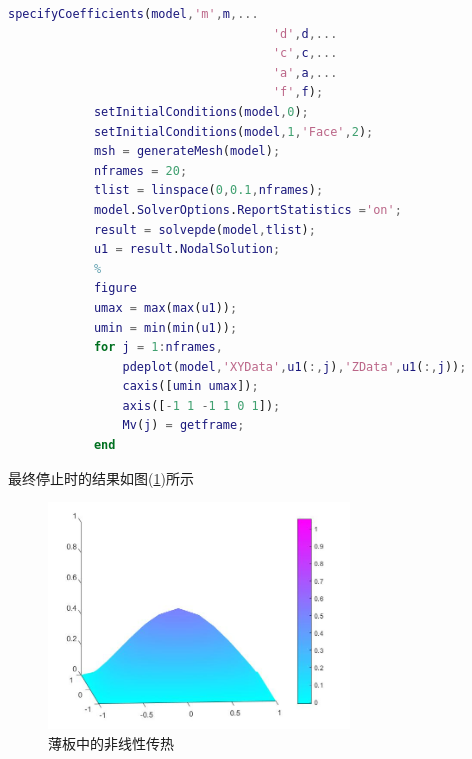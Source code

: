 \begin{lstlisting}[language = Matlab]
            specifyCoefficients(model,'m',m,...
                                     'd',d,...
                                     'c',c,...
                                     'a',a,...
                                     'f',f);
            setInitialConditions(model,0);
            setInitialConditions(model,1,'Face',2);
            msh = generateMesh(model);
            nframes = 20;
            tlist = linspace(0,0.1,nframes);
            model.SolverOptions.ReportStatistics ='on';
            result = solvepde(model,tlist);
            u1 = result.NodalSolution;
            %
            figure
            umax = max(max(u1));
            umin = min(min(u1));
            for j = 1:nframes,
                pdeplot(model,'XYData',u1(:,j),'ZData',u1(:,j));
                caxis([umin umax]);
                axis([-1 1 -1 1 0 1]);
                Mv(j) = getframe;
            end
            \end{lstlisting}
            最终停止时的结果如图(\ref{薄板中的非线性传热})所示
            \begin{figure}[H]
            \centering
            \includegraphics[width = 8cm]{images/PDE_example3_newmethod_jieguo.jpg}
            \caption{薄板中的非线性传热}
            \label{薄板中的非线性传热}
            \end{figure}



% 
